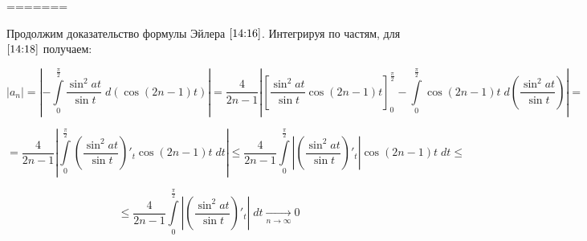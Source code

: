 \documentclass[../../main.tex]{subfiles}
\begin{document}
		
		
		
		
		
		
		
=======
			
	
		Продолжим доказательство формулы Эйлера $\eqref{14:16}$. Интегрируя по 
		частям, для $\eqref{14:18}$ получаем:
		
		\[  \left| a_n \right|   = \left| - \int\limits_{0}^{\frac{\pi}{2}} 
		\frac{\sin^2{at}}{\sin{t}} \; d\left( \cos{(2n-1)t}\right)   \right|  = 
		\frac{4}{2n-1} \left| \left[ \frac{\sin^2{at}}{\sin{t}} \cos{(2n-1)t} 
		\right]_{0}^{\frac{\pi}{2}} -\int\limits_{0}^{\frac{\pi}{2}} \cos{(2n-1)t} 
		\; d\left( \frac{\sin^2{at}}{\sin{t}} \right)   \right| =     \]
		
		\[  = \frac{4}{2n-1}\left| \int\limits_{0}^{\frac{\pi}{2}} \left( 
		\frac{\sin^2{at}}{\sin{t}} \right)'_t \cos{(2n-1)t} \; dt \right|  \le  
		\frac{4}{2n-1} \int\limits_{0}^{\frac{\pi}{2}} \left| \left( 
		\frac{\sin^2{at}}{\sin{t}} \right)'_t \right| \cos{(2n-1)t} \; dt  \le       
		          \]
		
		\[ \le \frac{4}{2n-1} \int\limits_{0}^{\frac{\pi}{2}} \left| \left( 
		\frac{\sin^2{at}}{\sin{t}} \right)'_t \right| \; dt  {\underset{n \to 
		\infty}\rightarrow} 0      \]
		
\end{document}
